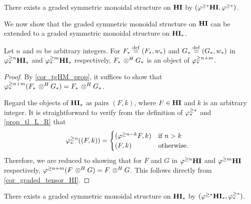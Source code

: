 \begin{cor}\label{cor_graded_tensor_HI}
There exists a graded symmetric monoidal structure on $\mathbf{HI}$ by
$(\varphi^{\geq *}\mathbf{HI}, \varphi^{\geq *})$.
\end{cor}

We now show that the graded symmetric monoidal structure on $\mathbf{HI}$
can be extended to a graded symmetric monoidal structure on $\mathbf{HI}_*$.

\begin{prop}\label{prop_graded_mon_struct_HM}
Let $n$ and $m$ be arbitrary integers. For $F_* \stackrel{\mathrm{def}}{=} (F_*, 
w_*)$ and $G_* \stackrel{\mathrm{def}}{=} (G_*,w_*)$ in $\varphi^{\geq n}_{*}\mathbf{HI}_*$ and 
$\varphi^{\geq m}_{*}\mathbf{HI}_*$ respectively, $F_* \,\otimes^H G_*$ is an object of 
$\varphi^{\geq n + m}_{*}$.
\end{prop}
\begin{proof}
By \ref{cor_tgHM_prop}, it suffices to show that $\varphi^{\geq n + m}_{*}(F_*
\,\otimes^H G_*) = F_* \,\otimes^H G_*$.

Regard the objects of $\mathbf{HI}_*$ as pairs $(F, k)$, where $F \in \mathbf{HI}$
and $k$ is an arbitrary integer. It is straightforward to 
verify from the definition of $\varphi^{\geq *}_{*}$ and \ref{prop_tl_L_R} 
that
\[
\varphi^{\geq n}_{*}((F, k)) = \begin{cases}
(\varphi^{\geq n - k}F, k) &\textrm{if }n > k\\
(F, k)             &\textrm{otherwise}.
\end{cases}
\]
Therefore, we are reduced to showing that for $F$ and $G$ in
$\varphi^{\geq n}\mathbf{HI}$ and $\varphi^{\geq m}\mathbf{HI}$ respectively, 
$\varphi^{\geq n + m}(F \,\otimes^H G) = F \,\otimes^H G$. This follows directly from 
\ref{cor_graded_tensor_HI}.
\end{proof}

\begin{cor}\label{cor_graded_mon_struct_HM}
There exists a graded symmetric monoidal structure on $\mathbf{HI}_*$ by
$(\varphi^{\geq *}\mathbf{HI}_*, \varphi^{\geq *}_{*})$.
\end{cor}
